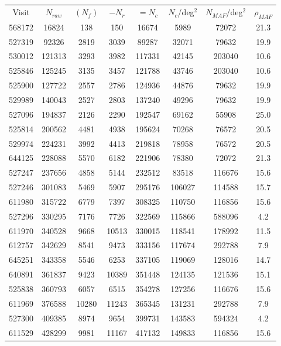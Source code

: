 \documentclass[DM,lsstdraft,toc,usenatbib]{lsstdoc}
\begin{document}
\begin{longtable}{cccccccc}
Visit & $N_{raw}$ & $(N_{f})$ & $-N_{r}$ & $=N_{c}$ & $N_{c}$/deg$^{2}$ & $N_{MAF}$/deg$^{2}$ & $\rho_{MAF}$ \\
568172 & 16824 & 138 & 150 & 16674 & 5989 & 72072 & 21.3 \\
527319 & 92326 & 2819 & 3039 & 89287 & 32071 & 79632 & 19.9 \\
530012 & 121313 & 3293 & 3982 & 117331 & 42145 & 203040 & 10.6 \\
525846 & 125245 & 3135 & 3457 & 121788 & 43746 & 203040 & 10.6 \\
525900 & 127722 & 2557 & 2786 & 124936 & 44876 & 79632 & 19.9 \\
529989 & 140043 & 2527 & 2803 & 137240 & 49296 & 79632 & 19.9 \\
527096 & 194837 & 2126 & 2290 & 192547 & 69162 & 55908 & 25.0 \\
525814 & 200562 & 4481 & 4938 & 195624 & 70268 & 76572 & 20.5 \\
529974 & 224231 & 3992 & 4413 & 219818 & 78958 & 76572 & 20.5 \\
644125 & 228088 & 5570 & 6182 & 221906 & 78380 & 72072 & 21.3 \\
527247 & 237656 & 4858 & 5144 & 232512 & 83518 & 116676 & 15.6 \\
527246 & 301083 & 5469 & 5907 & 295176 & 106027 & 114588 & 15.7 \\
611980 & 315722 & 6779 & 7397 & 308325 & 110750 & 116856 & 15.6 \\
527296 & 330295 & 7176 & 7726 & 322569 & 115866 & 588096 & 4.2 \\
611970 & 340528 & 9668 & 10513 & 330015 & 118541 & 178992 & 11.5 \\
612757 & 342629 & 8541 & 9473 & 333156 & 117674 & 292788 & 7.9 \\
645251 & 343358 & 5546 & 6253 & 337105 & 119069 & 128016 & 14.7 \\
640891 & 361837 & 9423 & 10389 & 351448 & 124135 & 121536 & 15.1 \\
525838 & 360793 & 6057 & 6515 & 354278 & 127256 & 116676 & 15.6 \\
611969 & 376588 & 10280 & 11243 & 365345 & 131231 & 292788 & 7.9 \\
527300 & 409385 & 8974 & 9654 & 399731 & 143583 & 594324 & 4.2 \\
611529 & 428299 & 9981 & 11167 & 417132 & 149833 & 116856 & 15.6 \\

\end{longtable}
\end{document}
